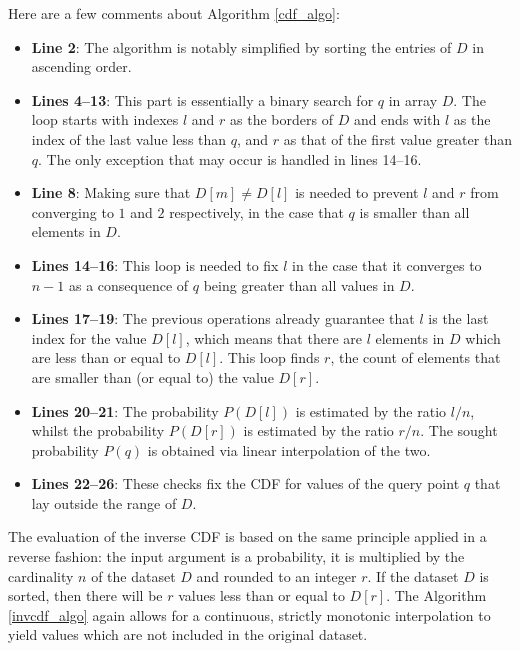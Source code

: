 \documentclass[10pt,final]{siamltex}
\begin{document}
Here are a few comments about Algorithm \ref{cdf_algo}:
\begin{itemize}
  \item \textbf{Line 2}: The algorithm is notably simplified by sorting the entries of $D$ in ascending order.
  \item \textbf{Lines 4--13}: This part is essentially a binary search for $q$ in array $D$. The loop starts with indexes $l$ and $r$ as the borders of $D$ and ends with $l$ as the index of the last value less than $q$, and $r$ as that of the first value greater than $q$. The only exception that may occur is handled in lines 14--16.
  \item \textbf{Line 8}: Making sure that $D[m]\neq D[l]$ is needed to prevent $l$ and $r$ from converging to $1$ and $2$ respectively, in the case that $q$ is smaller than all elements in $D$.
  \item \textbf{Lines 14--16}: This loop is needed to fix $l$ in the case that it converges to $n-1$ as a consequence of $q$ being greater than all values in $D$.
  \item \textbf{Lines 17--19}: The previous operations already guarantee that $l$ is the last index for the value $D[l]$, which means that there are $l$ elements in $D$ which are less than or equal to $D[l]$. This loop finds $r$, the count of elements that are smaller than (or equal to) the value $D[r]$.
  \item \textbf{Lines 20--21}: The probability $P(D[l])$ is estimated by the ratio $l/n$, whilst the probability $P(D[r])$ is estimated by the ratio $r/n$. The sought probability $P(q)$ is obtained via linear interpolation of the two.
  \item \textbf{Lines 22--26}: These checks fix the CDF for values of the query point $q$ that lay outside the range of $D$.
\end{itemize}
%

The evaluation of the inverse CDF is based on the same principle applied in a reverse fashion: the input argument is a probability, it is multiplied by the cardinality $n$ of the dataset $D$ and rounded to an integer $r$. If the dataset $D$ is sorted, then there will be $r$ values less than or equal to $D[r]$. The Algorithm \ref{invcdf_algo} again allows for a continuous, strictly monotonic interpolation to yield values which are not included in the original dataset.
\end{document}
